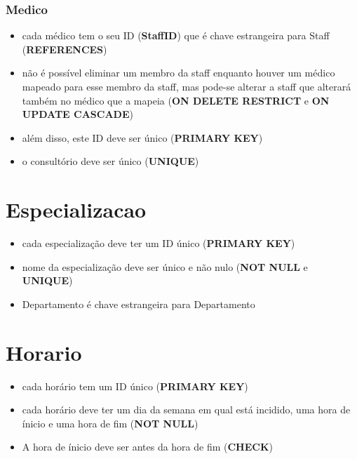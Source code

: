 \documentclass[article, a4paper, 12pt, oneside]{memoir}
\begin{document}
\subsubsection*{Medico}
\begin{itemize}
	\item cada médico tem o seu ID (\textbf{StaffID}) que é chave estrangeira para Staff (\textbf{REFERENCES})
	\item não é possível eliminar um membro da staff enquanto houver um médico mapeado para esse membro da staff, mas pode-se alterar a staff que alterará também no médico que a mapeia (\textbf{ON DELETE RESTRICT} e \textbf{ON UPDATE CASCADE})
	\item além disso, este ID deve ser único (\textbf{PRIMARY KEY})
	\item o consultório deve ser único (\textbf{UNIQUE})
\end{itemize}

\section*{Especializacao}
\begin{itemize}
	\item cada especialização deve ter um ID único (\textbf{PRIMARY KEY})
	\item nome da especialização deve ser único e não nulo (\textbf{NOT NULL} e \textbf{UNIQUE})
	\item Departamento é chave estrangeira para Departamento
\end{itemize}

\section*{Horario}
\begin{itemize}
	\item cada horário tem um ID único (\textbf{PRIMARY KEY})
	\item cada horário deve ter um dia da semana em qual está incidido, uma hora de ínicio e uma hora de fim (\textbf{NOT NULL})
	\item A hora de ínicio deve ser antes da hora de fim (\textbf{CHECK})
\end{itemize}

\newpage
\end{document}
